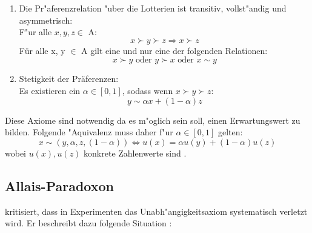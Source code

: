 \documentclass[11pt]{article}
\begin{document}
\begin{itemize}
\begin{enumerate}
    
  \item Die Pr"aferenzrelation "uber die Lotterien ist transitiv, vollst"andig und asymmetrisch:\\
    F"ur alle $x, y, z \in$ A:
      \begin{equation}
      \label{eq:1}
     x \succ y \succ z \Rightarrow x \succ z \tag{Transitivit"at}
    \end{equation}
    F\"ur alle x, y $\in$ A gilt eine und nur eine der folgenden Relationen:
    \begin{equation}
      \label{eq:2}
     x \succ y \text{ oder } y \succ x \text{ oder } x \sim y \tag{Vollst"andigkeit  \& Asymmetrie}
    \end{equation}
  \item Stetigkeit der Pr\"aferenzen:\\
    Es existieren ein $\alpha \in [0,1]$, sodass wenn $x \succ y \succ z$:
    \begin{equation}
      \label{eq:3}
      y \sim \alpha x + (1-\alpha) z \tag{Stetigkeit}
    \end{equation}
  \end{enumerate}
\end{itemize}

Diese Axiome sind notwendig da es m"oglich sein soll, einen Erwartungswert zu bilden. Folgende "Aquivalenz muss daher f"ur $\alpha \in [0,1]$ gelten: 
\begin{equation}
  \label{eq:5}
  x \sim (y, \alpha, z, (1-\alpha)) \Leftrightarrow u(x) = \alpha u(y) + (1-\alpha)u(z)
\end{equation}
wobei $u(x),u(z)$ konkrete Zahlenwerte sind \parencite[siehe ][S. 190f.]{rieck2012spieltheorie}.

\subsection{Allais-Paradoxon}
\label{sec:allais-paradoxon}

\textcite{allais_paradox} kritisiert, dass in Experimenten das Unabh"angigkeitsaxiom systematisch verletzt wird. Er beschreibt dazu folgende Situation \parencite[S. 527]{allais_paradox}: 
\end{document}
